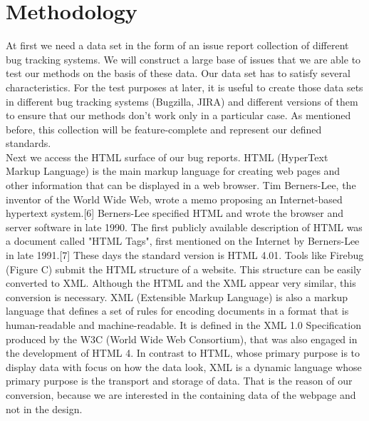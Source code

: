 \section{Methodology}
\label{Methodology}
At first we need a data set in the form of an issue report collection of different bug tracking systems. We will construct a large base of issues that we are able to test our methods on the basis of these data. Our data set has to satisfy several characteristics. For the test purposes at later, it is useful to create those data sets in different bug tracking systems (Bugzilla, JIRA) and different versions of them to ensure that our methods don't work only in a particular case. As mentioned before, this collection will be feature-complete and represent our defined standards. \\ Next we access the HTML surface of our bug reports. HTML (HyperText Markup Language) is the main markup language for creating web pages and other information that can be displayed in a web browser. Tim Berners-Lee, the inventor of the World Wide Web, wrote a memo proposing an Internet-based hypertext system.[6] Berners-Lee specified HTML and wrote the browser and server software in late 1990. The first publicly available description of HTML was a document called "HTML Tags", first mentioned on the Internet by Berners-Lee in late 1991.[7] These days the standard version is HTML 4.01. Tools like Firebug (Figure C) submit the HTML structure of a website. This structure can be easily converted to XML. Although the HTML and the XML appear very similar, this conversion is necessary. XML (Extensible Markup Language) is also a markup language that defines a set of rules for encoding documents in a format that is human-readable and machine-readable. It is defined in the XML 1.0 Specification produced by the W3C (World Wide Web Consortium), that was also engaged in the development of HTML 4. In contrast to HTML, whose primary purpose is to display data with focus on how the data look, XML is a dynamic language whose primary purpose is the transport and storage of data. That is the reason of our conversion, because we are interested in the containing data of the webpage and not in the design.\\ 